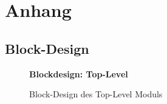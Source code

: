 \chapter{Anhang}

\begin{landscape}
	\section{Block-Design} \label{Appendix:BlockDesign}
	\begin{figure}[h] 
  		\centering
  		\textbf{Blockdesign: Top-Level}
  		\caption{Block-Design des Top-Level Moduls}
	\end{figure}
	

\end{landscape}
